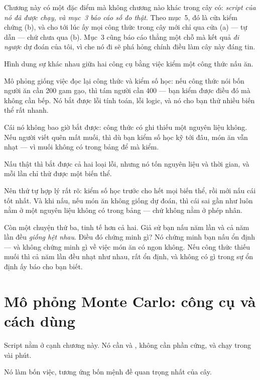 \documentclass[../../marker.tex]{subfiles}
\begin{document}
Chương này có một đặc điểm mà không chương nào khác trong cây có: \emph{script của nó đã được chạy, và mục~3 báo cáo số đo thật}. Theo  mục~5, đó là cửa kiểm chứng (b), và cho tới lúc ấy mọi công thức trong cây mới chỉ qua cửa (a) --- tự dẫn --- chứ chưa qua (b). Mục~3 cũng báo cáo thẳng một chỗ mà kết quả \emph{đi ngược} dự đoán của tôi, vì che nó đi sẽ phá hỏng chính điều làm cây này đáng tin.

\begin{trucgiac}
Hình dung sự khác nhau giữa hai công cụ bằng việc kiểm một công thức nấu ăn.

Mô phỏng giống việc đọc lại công thức và kiểm số học: nếu công thức nói bốn người ăn cần 200 gam gạo, thì tám người cần 400 --- bạn kiểm được điều đó mà không cần bếp. Nó bắt được lỗi tính toán, lỗi logic, và nó cho bạn thử nhiều biến thể rất nhanh.

Cái nó không bao giờ bắt được: công thức có ghi thiếu một nguyên liệu không. Nếu người viết quên mất muối, thì dù bạn kiểm số học kỹ tới đâu, món ăn vẫn nhạt --- vì muối không có trong bảng để mà kiểm.

Nấu thật thì bắt được cả hai loại lỗi, nhưng nó tốn nguyên liệu và thời gian, và mỗi lần chỉ thử được một biến thể.

Nên thứ tự hợp lý rất rõ: kiểm số học trước cho hết mọi biến thể, rồi mới nấu cái tốt nhất. Và khi nấu, nếu món ăn không giống dự đoán, thì cái sai gần như luôn nằm ở một nguyên liệu không có trong bảng --- chứ không nằm ở phép nhân.

Còn một chuyện thứ ba, tinh tế hơn cả hai. Giả sử bạn nấu năm lần và cả năm lần đều \emph{giống hệt nhau}. Điều đó chứng minh gì? Nó chứng minh bạn nấu ổn định --- và không chứng minh gì về việc món ăn có ngon không. Nếu công thức thiếu muối thì cả năm lần đều nhạt như nhau, rất ổn định, và không có gì trong sự ổn định ấy báo cho bạn biết.
\end{trucgiac}

\section{Mô phỏng Monte Carlo: công cụ và cách dùng}

Script nằm ở  cạnh chương này. Nó cần  và , không cần phần cứng, và chạy trong vài phút.

Nó làm bốn việc, tương ứng bốn mệnh đề quan trọng nhất của cây.
\end{document}
